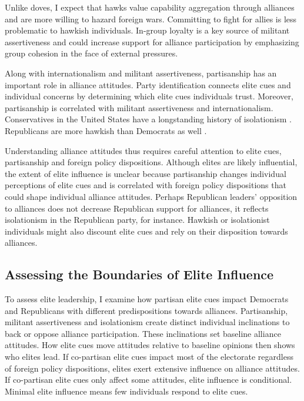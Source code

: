 \documentclass[12pt]{article}
\begin{document}
Unlike doves, I expect that hawks value capability aggregation through alliances and are more willing to hazard foreign wars. 
Committing to fight for allies is less problematic to hawkish individuals. 
In-group loyalty is a key source of militant assertiveness \citep{Kertzeretal2014} and could increase support for alliance participation by emphasizing group cohesion in the face of external pressures.


Along with internationalism and militant assertiveness, partisanship has an important role in alliance attitudes. 
Party identification connects elite cues and individual concerns by determining which elite cues individuals trust.
Moreover, partisanship is correlated with militant assertiveness and internationalism. 
Conservatives in the United States have a longstanding history of isolationism \citep{Kupchan2020}.
Republicans are more hawkish than Democrats as well \citep{Gries2014}. 


Understanding alliance attitudes thus requires careful attention to elite cues, partisanship and foreign policy dispositions. 
Although elites are likely influential, the extent of elite influence is unclear because partisanship changes individual perceptions of elite cues and is correlated with foreign policy dispositions that could shape individual alliance attitudes. 
Perhaps Republican leaders' opposition to alliances does not decrease Republican support for alliances, it reflects isolationism in the Republican party, for instance. 
Hawkish or isolationist individuals might also discount elite cues and rely on their disposition towards alliances. 



\subsection{Assessing the Boundaries of Elite Influence}


To assess elite leadership, I examine how partisan elite cues impact Democrats and Republicans with different predispositions towards alliances.
Partisanship, militant assertiveness and isolationism create distinct individual inclinations to back or oppose alliance participation. 
These inclinations set baseline alliance attitudes. 
How elite cues move attitudes relative to baseline opinions then shows who elites lead. 
If co-partisan elite cues impact most of the electorate regardless of foreign policy dispositions, elites exert extensive influence on alliance attitudes. 
If co-partisan elite cues only affect some attitudes, elite influence is conditional. 
Minimal elite influence means few individuals respond to elite cues. 
\end{document}
